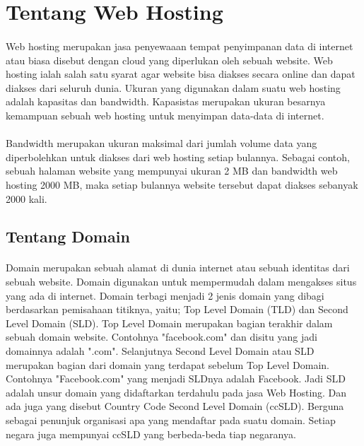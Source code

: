 \documentclass[12pt, a4paper]{article}
\begin{document}
\section{Tentang Web Hosting}
\paragraph{}Web hosting merupakan jasa penyewaaan tempat penyimpanan data di internet atau biasa disebut dengan cloud
yang diperlukan oleh sebuah website. Web hosting ialah salah satu syarat agar website bisa diakses secara 
online dan dapat diakses dari seluruh dunia. Ukuran yang digunakan dalam suatu web hosting adalah kapasitas
dan bandwidth. Kapasistas merupakan ukuran besarnya kemampuan sebuah web hosting untuk menyimpan data-data di internet.

\paragraph{}Bandwidth merupakan ukuran maksimal dari jumlah volume data yang diperbolehkan untuk diakses dari web hosting
setiap bulannya. Sebagai contoh, sebuah halaman website yang mempunyai ukuran 2 MB dan bandwidth web hosting
2000 MB, maka setiap bulannya website tersebut dapat diakses sebanyak 2000 kali.

\subsection{Tentang Domain}
\paragraph{}Domain merupakan sebuah alamat di dunia internet atau sebuah identitas dari sebuah website. Domain digunakan untuk mempermudah dalam mengakses situs yang ada di internet. Domain terbagi menjadi 2 jenis domain yang dibagi berdasarkan pemisahaan titiknya, yaitu; Top Level Domain (TLD) dan Second Level Domain (SLD). Top Level Domain merupakan bagian terakhir dalam sebuah domain website. Contohnya "facebook.com" dan disitu yang jadi domainnya adalah ".com". Selanjutnya Second Level Domain atau SLD merupakan bagian dari domain yang terdapat sebelum Top Level Domain. Contohnya "Facebook.com" yang menjadi SLDnya adalah Facebook. Jadi SLD adalah unsur domain yang didaftarkan terdahulu pada jasa Web Hosting. Dan ada juga yang disebut Country Code Second Level Domain (ccSLD). Berguna sebagai penunjuk organisasi apa yang mendaftar pada suatu domain. Setiap negara juga mempunyai ccSLD yang berbeda-beda tiap negaranya.
\end{document}
